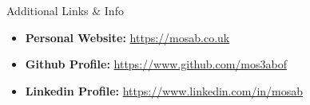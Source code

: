 \documentclass[]{mosabcv}
\begin{document}
\begin{cvsection}{Additional Links \& Info}
  \begin{cvsubsection}{}{}{}
    \begin{itemize}
      \item \textbf{Personal Website:}
        \href{https://mosab.co.uk}{https://mosab.co.uk}
      \item \textbf{Github Profile:} \href{https://www.github.com/mos3abof}{https://www.github.com/mos3abof}
      \item \textbf{Linkedin Profile:} \href{https://www.linkedin.com/in/mosab}{https://www.linkedin.com/in/mosab}
    \end{itemize}
  \end{cvsubsection}
\end{cvsection}
\end{document}
